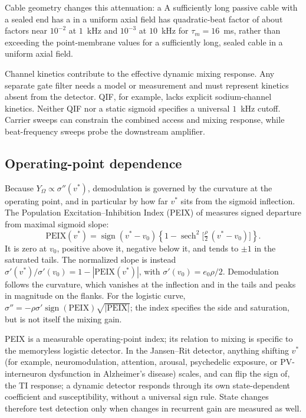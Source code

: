 \documentclass[11pt,a4paper]{article}
\newcommand{\Sig}{\sigma}
\providecommand{\DIFaddtex}[1]{{\protect\color{blue} \sf #1}} %
\providecommand{\DIFdeltex}[1]{{\protect\color{red} \scriptsize #1}} %
\providecommand{\DIFaddbegin}{} %
\providecommand{\DIFaddend}{} %
\providecommand{\DIFdelbegin}{} %
\providecommand{\DIFdelend}{} %
\providecommand{\DIFadd}[1]{\texorpdfstring{\DIFaddtex{#1}}{#1}} %
\providecommand{\DIFdel}[1]{\texorpdfstring{\DIFdeltex{#1}}{}} %
\begin{document}
\DIFdelbegin \DIFdel{Cable geometry changes this attenuation: a }\DIFdelend \DIFaddbegin \DIFadd{A sufficiently }\DIFaddend long passive cable with a sealed end \DIFdelbegin \DIFdel{has a }\DIFdelend \DIFaddbegin \DIFadd{in a uniform axial field
has }\DIFaddend quadratic-beat \DIFdelbegin \DIFdel{factor of about }\DIFdelend \DIFaddbegin \DIFadd{factors near }\DIFaddend $10^{-2}$ at $1$~kHz and $10^{-3}$ at
$10$~kHz for $\tau_m=16$~ms, \DIFdelbegin \DIFdel{rather than }\DIFdelend \DIFaddbegin \DIFadd{exceeding }\DIFaddend the point-membrane values\DIFdelbegin \DIFdel{for a sufficiently long, sealed cable in a uniform axial field}\DIFdelend .

Channel kinetics contribute to the effective dynamic mixing response. Any separate gate filter needs a model or measurement and must represent
kinetics absent from the detector. QIF, for example, lacks explicit sodium-channel
kinetics. Neither QIF nor a static sigmoid specifies a universal $1$~kHz cutoff.
Carrier sweeps can constrain the
combined access and mixing response, while beat-frequency sweeps probe the
downstream amplifier.

\subsection{Operating-point dependence}\label{sec:opp}
Because $Y_\Omega\propto\Sig''(v^*)$, demodulation is governed by the curvature at
the operating point, and in particular by how far $v^*$ sits from the sigmoid
inflection. The Population Excitation--Inhibition Index (PEIX)
of \cite{ruffini2025cfc} measures signed departure from maximal sigmoid slope:
\begin{equation}
\mathrm{PEIX}(v^*)=\operatorname{sign}(v^*-v_0)
\left\{1-\operatorname{sech}^2\!\Big[\tfrac{\rho}{2}\,(v^*-v_0)\Big]\right\}.
\label{eq:peix}
\end{equation}
It is zero at $v_0$, positive above it, negative below it, and tends to $\pm1$
in the saturated tails. The normalized slope is instead
$\Sig'(v^*)/\Sig'(v_0)=1-|\mathrm{PEIX}(v^*)|$, with
$\Sig'(v_0)=e_0\rho/2$. Demodulation follows the curvature, which vanishes at
the inflection and in the tails and peaks in magnitude on the flanks. For the
logistic curve,
$\Sig''=-\rho\Sig'\operatorname{sign}(\mathrm{PEIX})\sqrt{|\mathrm{PEIX}|}$;
the index specifies the side and saturation, but is not itself the mixing gain.

PEIX is a measurable operating-point index; its relation to mixing is specific
to the memoryless logistic detector. In the Jansen--Rit detector, anything shifting $v^*$
(for example, neuromodulation, attention, arousal, psychedelic exposure, or
PV-interneuron dysfunction in Alzheimer's disease) scales, and can flip the sign of, the TI response; a dynamic detector responds through its own state-dependent coefficient and
susceptibility, without a universal sign rule. State changes therefore test detection only when changes in recurrent gain
are measured as well.
\end{document}
